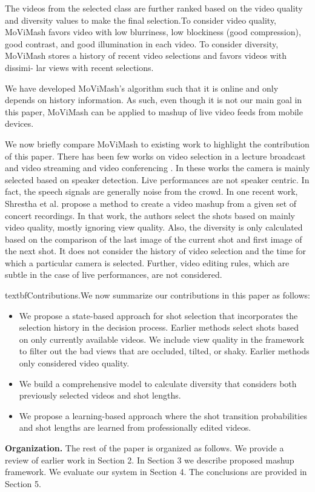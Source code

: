 \documentclass{sig-alternate}
\begin{document}
The videos from the selected class are further ranked based on the video quality and diversity values to make the final selection.To consider video quality, MoViMash favors video with low blurriness, low blockiness (good compression), good contrast, and good illumination in each video. To consider diversity, MoViMash stores a history of recent video selections and favors videos with dissimi-
lar views with recent selections.

We have developed MoViMash’s algorithm such that it is online and only depends on history information. As such, even though it is not our main goal in this paper, MoViMash can be applied to mashup of live video feeds from mobile devices.

We now briefly compare MoViMash to existing work to highlight the contribution of this paper. There has been few works on video selection in a lecture broadcast and video streaming \cite{21} \cite{6} and video conferencing \cite{3}. In these works the camera is mainly selected based on speaker detection. Live performances are not speaker centric. In fact, the speech signals are generally noise from the crowd. In one recent work, Shrestha et al. \cite{15} propose a method to create a video mashup from a given set of concert recordings. In that work, the authors select the shots based on mainly video quality, mostly ignoring view quality. Also, the diversity is only calculated based on the comparison of the last image of the current shot and first image of the next shot. It does not consider the history of video selection and the time for which a particular camera is selected. Further, video editing rules, which are subtle in the case of live performances, are not considered.

textbf{Contributions.}We now summarize our contributions in this paper as follows:
\begin{itemize}
\item We propose a state-based approach for shot selection that incorporates the selection history in the decision process. Earlier methods select shots based on only currently available videos. We include view quality in the framework to filter out the bad views that are occluded, tilted, or shaky. Earlier methods only considered video quality.
\item We build a comprehensive model to calculate diversity that considers both previously selected videos and shot lengths.
\item We propose a learning-based approach where the shot transition probabilities and shot lengths are learned from professionally edited videos. 
\end{itemize}
\textbf{Organization.} The rest of the paper is organized as follows.
We provide a review of earlier work in Section 2. In Section 3 we
describe proposed mashup framework. We evaluate our system in
Section 4. The conclusions are provided in Section 5.
\end{document}
